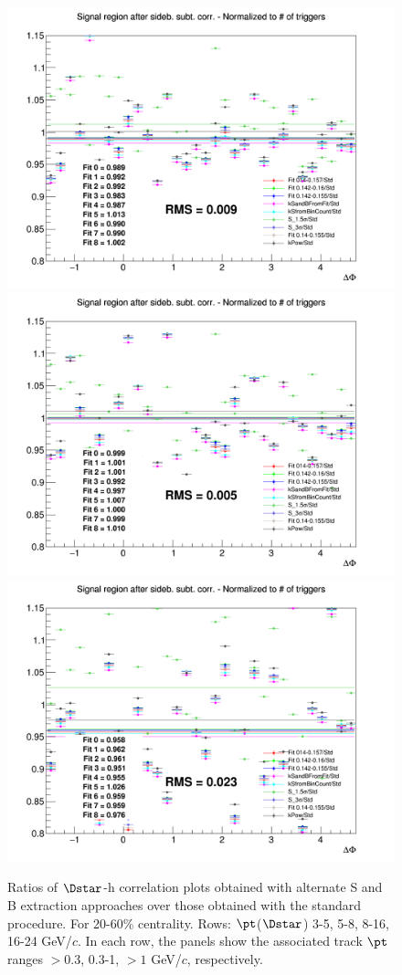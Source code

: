 \begin{figure}
{\includegraphics[width=0.31\linewidth]{figuresVsCent/Dstar/SystSandB/2060_SandB_Syst/Ratio_AzimCorrDistr_Dstar_Canvas_PtIntBins10to10_PoolInt_thr03to99_YIELD_2060.png}}
{\includegraphics[width=0.31\linewidth]{figuresVsCent/Dstar/SystSandB/2060_SandB_Syst/Ratio_AzimCorrDistr_Dstar_Canvas_PtIntBins10to10_PoolInt_thr03to1_YIELD_2060.png}}
{\includegraphics[width=0.31\linewidth]{figuresVsCent/Dstar/SystSandB/2060_SandB_Syst/Ratio_AzimCorrDistr_Dstar_Canvas_PtIntBins10to10_PoolInt_thr1to99_YIELD_2060.png}} \\
 \caption{Ratios of $\Dstar$-h correlation plots obtained with alternate S and B extraction approaches over those obtained with the standard procedure. For 20-60\% centrality. Rows: $\pt$($\Dstar$) 3-5, 5-8, 8-16, 16-24 GeV/$c$. In each row, the panels show the associated track
$\pt$ ranges $> 0.3$, 0.3-1, $> 1$ GeV/$c$, respectively.}
\label{fig:SysSandB2060Dstar}
\end{figure}


